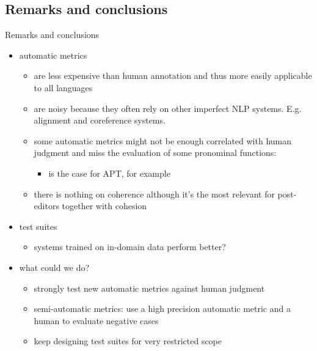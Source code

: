 \subsection{Remarks and conclusions}
\begin{frame}{Remarks and conclusions}
	
	\begin{itemize}
		\item automatic metrics
		\begin{itemize}
			\item are less expensive than human annotation and thus more easily applicable to all languages 
			\item are noisy because they often rely on other imperfect NLP systems. E.g. alignment and coreference systems.
			\item some automatic metrics might not be enough correlated with human judgment and miss the evaluation of some pronominal functions:
			\begin{itemize}
				\item is the case for APT, for example \cite{guillou_automatic_2018}
			\end{itemize}
			\item there is nothing on coherence although it's the most relevant for post-editors together with cohesion
		\end{itemize}
	
		\item test suites
		\begin{itemize}
			\item systems trained on in-domain data perform better?
		\end{itemize}

		\item what could we do?
		\begin{itemize}
			\item strongly test new automatic metrics against human judgment
			\item semi-automatic metrics: use a high precision automatic metric and a human to evaluate negative cases
			\item keep designing test suites for very restricted scope
		\end{itemize}
	\end{itemize}
	
\end{frame}



		


